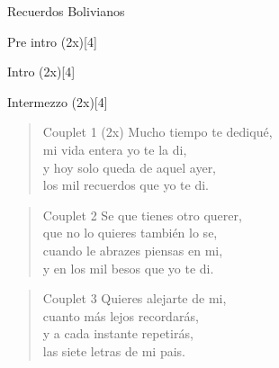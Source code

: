 \begin{song}[huayno]{Recuerdos Bolivianos}

\begin{instrumental}{Pre intro (2x)}[4]
   
   
\end{instrumental}

\begin{instrumental}{Intro (2x)}[4]
   
   
\end{instrumental}

\begin{instrumental}{Intermezzo (2x)}[4]
    
    
\end{instrumental}

\begin{verse}{Couplet 1 (2x)}
Mucho tiempo te dediqué,\\
mi vida entera yo te la di,\\
y hoy solo queda de aquel ayer,\\
los mil recuerdos que yo te di.
\end{verse}

\begin{verse}{Couplet 2}
Se que tienes otro querer,\\
que no lo quieres también lo se,\\
cuando le abrazes piensas en mi,\\
y en los mil besos que yo te di.
\end{verse}

\begin{verse}{Couplet 3}
Quieres alejarte de mi,\\
cuanto más lejos recordarás,\\
y a cada instante repetirás,\\
las siete letras de mi pais.
\end{verse}


\end{song}
